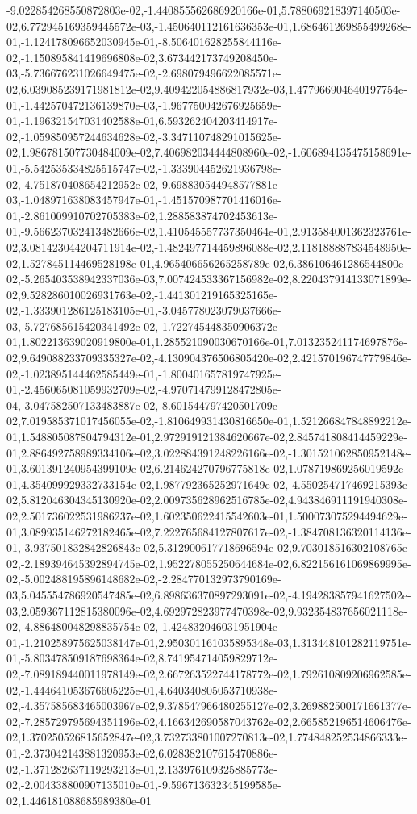 -9.022854268550872803e-02,-1.440855562686920166e-01,5.788069218397140503e-02,6.772945169359445572e-03,-1.450640112161636353e-01,1.686461269855499268e-01,-1.124178096652030945e-01,-8.506401628255844116e-02,-1.150895841419696808e-02,3.673442173749208450e-03,-5.736676231026649475e-02,-2.698079496622085571e-02,6.039085239171981812e-02,9.409422054886817932e-03,1.477966904640197754e-01,-1.442570472136139870e-03,-1.967750042676925659e-01,-1.196321547031402588e-01,6.593262404203414917e-02,-1.059850957244634628e-02,-3.347110748291015625e-02,1.986781507730484009e-02,7.406982034444808960e-02,-1.606894135475158691e-01,-5.542535334825515747e-02,-1.333904452621936798e-02,-4.751870408654212952e-02,-9.698830544948577881e-03,-1.048971638083457947e-01,-1.451570987701416016e-01,-2.861009910702705383e-02,1.288583874702453613e-01,-9.566237032413482666e-02,1.410545557737350464e-01,2.913584001362323761e-02,3.081423044204711914e-02,-1.482497714459896088e-02,2.118188887834548950e-02,1.527845114469528198e-01,4.965406656265258789e-02,6.386106461286544800e-02,-5.265403538942337036e-03,7.007424533367156982e-02,8.220437914133071899e-02,9.528286010026931763e-02,-1.441301219165325165e-02,-1.333901286125183105e-01,-3.045778023079037666e-03,-5.727685615420341492e-02,-1.722745448350906372e-01,1.802213639020919800e-01,1.285521090030670166e-01,7.013235241174697876e-02,9.649088233709335327e-02,-4.130904376506805420e-02,2.421570196747779846e-02,-1.023895144462585449e-01,-1.800401657819747925e-01,-2.456065081059932709e-02,-4.970714799128472805e-04,-3.047582507133483887e-02,-8.601544797420501709e-02,7.019585371017456055e-02,-1.810649931430816650e-01,1.521266847848892212e-01,1.548805087804794312e-01,2.972919121384620667e-02,2.845741808414459229e-01,2.886492758989334106e-02,3.022884391248226166e-02,-1.301521062850952148e-01,3.601391240954399109e-02,6.214624270796775818e-02,1.078719869256019592e-01,4.354099929332733154e-02,1.987792365252971649e-02,-4.550254717469215393e-02,5.812046304345130920e-02,2.009735628962516785e-02,4.943846911191940308e-02,2.501736022531986237e-02,1.602350622415542603e-01,1.500073075294494629e-01,3.089935146272182465e-02,7.222765684127807617e-02,-1.384708136320114136e-01,-3.937501832842826843e-02,5.312900617718696594e-02,9.703018516302108765e-02,-2.189394645392894745e-02,1.952278055250644684e-02,6.822156161069869995e-02,-5.002488195896148682e-02,-2.284770132973790169e-03,5.045554786920547485e-02,6.898636370897293091e-02,-4.194283857941627502e-03,2.059367112815380096e-02,4.692972823977470398e-02,9.932354837656021118e-02,-4.886480048298835754e-02,-1.424832046031951904e-01,-1.210258975625038147e-01,2.950301161035895348e-03,1.313448101282119751e-01,-5.803478509187698364e-02,8.741954714059829712e-02,-7.089189440011978149e-02,2.667263522744178772e-02,1.792610809206962585e-02,-1.444641053676605225e-01,4.640340805053710938e-02,-4.357585683465003967e-02,9.378547966480255127e-02,3.269882500171661377e-02,-7.285729795694351196e-02,4.166342690587043762e-02,2.665852196514606476e-02,1.370250526815652847e-02,3.732733801007270813e-02,1.774848252534866333e-01,-2.373042143881320953e-02,6.028382107615470886e-02,-1.371282637119293213e-01,2.133976109325885773e-02,-2.004338800907135010e-01,-9.596713632345199585e-02,1.446181088685989380e-01
